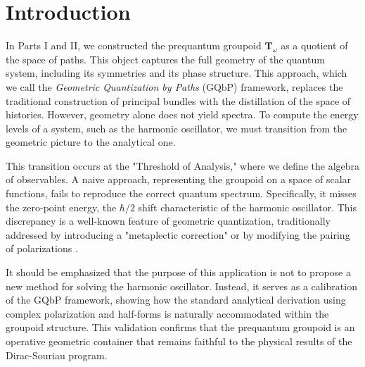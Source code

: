 \documentclass[11pt,reqno,letterpaper,twoside]{amsart}
\theoremstyle{articlestyle}
\theoremstyle{plain}
\theoremstyle{definition}
\newcommand{\TT}{\mathbf{T}}
\newcommand{\0}{\hat{0}}
\newcommand{\1}{\hat{1}}
\begin{document}
  
  
  \maketitle
  
  
  \section*{{\textbf{Introduction}}}
  
  In Parts I and II,
  we constructed the prequantum groupoid $\TT_\omega$ as a quotient of the space of paths.
  This object captures the full geometry of the quantum system,
  including its symmetries and its phase structure.
  This approach,
  which we call the \emph{Geometric Quantization by Paths} (GQbP) framework,
  replaces the traditional construction of principal bundles 
  with the distillation of the space of histories.
  However,
  geometry alone does not yield spectra.
  To compute the energy levels of a system,
  such as the harmonic oscillator,
  we must transition from the geometric picture to the analytical one.
  
  This transition occurs at the "Threshold of Analysis,"
  where we define the algebra of observables.
  A naive approach,
  representing the groupoid on a space of scalar functions,
  fails to reproduce the correct quantum spectrum.
  Specifically,
  it misses the zero-point energy,
  the $\hbar/2$ shift characteristic of the harmonic oscillator.
  This discrepancy is a well-known feature of geometric quantization,
  traditionally addressed by introducing a "metaplectic correction" \cite{Sou70, Kos70}
  or by modifying the pairing of polarizations \cite{Woo92}.
  
  It should be emphasized that the purpose of this application 
  is not to propose a new method for solving the harmonic oscillator.
  Instead,
  it serves as a calibration of the GQbP framework,
  showing how the standard analytical derivation 
  using complex polarization and half-forms 
  is naturally accommodated within the groupoid structure.
  This validation confirms that the prequantum groupoid 
  is an operative geometric container 
  that remains faithful to the physical results of the Dirac-Souriau program.
  
\end{document}
